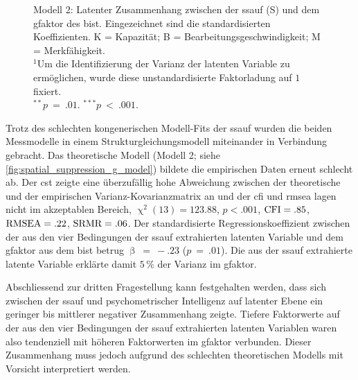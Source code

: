 \documentclass[11pt, twoside, a4paper]{book}		%
\begin{document}
\begin{figure}[htbp]
	
	\vspace{.2cm}
	\caption[Modell 2: Latenter Zusammenhang zwischen der \gls{ssauf} und dem \gls{gfaktor}]{Modell 2: Latenter Zusammenhang zwischen der \gls{ssauf} (\textsf{S}) und dem \gls{gfaktor} des \gls{bist}. Eingezeichnet sind die standardisierten Koeffizienten. \textsf{K} = Kapazität; \textsf{B} = Bearbeitungsgeschwindigkeit; \textsf{M} = Merkfähigkeit.\\
	$^1$Um die Identifizierung der Varianz der latenten Variable zu ermöglichen, wurde diese unstandardisierte Faktorladung auf $1$ fixiert.\\
	$^{**}p~=~.01$. $^{***}p~<~.001$.}
	\label{fig:spatial_suppression_g_model}
\end{figure} 

Trotz des schlechten kongenerischen Modell-Fits der \gls{ssauf} wurden die beiden Messmodelle in einem Strukturgleichungsmodell miteinander in Verbindung gebracht. Das theoretische Modell (Modell 2; siehe \autoref{fig:spatial_suppression_g_model}) bildete die empirischen Daten erneut schlecht ab.  Der \gls{cst} zeigte eine überzufällig hohe Abweichung zwischen der theoretische und der empirischen Var\-ianz-Ko\-var\-ianz\-ma\-trix an und der \gls{cfi} und \gls{rmsea} lagen nicht im akzeptablen Bereich, $\upchi^2(13)=123.88$, $p<.001$, $\textnormal{CFI}=.85$, $\textnormal{RMSEA}=.22$, $\textnormal{SRMR}=.06$. 
Der standardisierte Regressionskoeffizient zwischen der aus den vier Bedingungen der \gls{ssauf} extrahierten latenten Variable und dem \gls{gfaktor} aus dem \gls{bist} betrug $\upbeta~=~-.23$ ($p~=~.01$).
Die aus der \gls{ssauf} extrahierte latente Variable erklärte damit $5\,\%$ der Varianz im \gls{gfaktor}.

Abschliessend zur dritten Fragestellung kann festgehalten werden, dass sich zwischen der \gls{ssauf} und psychometrischer Intelligenz auf latenter Ebene ein geringer bis mittlerer negativer Zusammenhang zeigte.
Tiefere Faktorwerte auf der aus den vier Bedingungen der \gls{ssauf} extrahierten latenten Variablen waren also tendenziell mit höheren Faktorwerten im \gls{gfaktor} verbunden. Dieser Zusammenhang muss jedoch aufgrund des schlechten theoretischen Modells  mit Vorsicht interpretiert werden.
\end{document}
